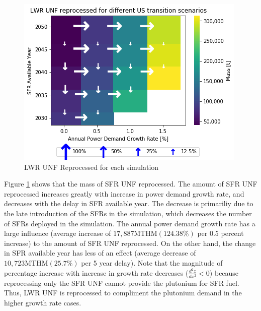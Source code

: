 \begin{figure}[htbp!]
    \begin{center}
        \includegraphics[scale=0.7]{./images/us/scat_both_LWR_UNF_reprocessed.png}
    \end{center}
        \caption{\gls{LWR} \gls{UNF} Reprocessed for each simulation}
    \label{fig:us_lwr_unf_rep}
\end{figure}


Figure \ref{fig:us_lwr_unf_rep} shows that the mass of \gls{SFR} \gls{UNF} reprocessed.
The amount of \gls{SFR} \gls{UNF} reprocessed increases greatly with increase
in power demand growth rate, and decreases with the delay in
\gls{SFR} available year. The decrease is primariliy due to
the late introduction of the \glspl{SFR} in the simulation, which decreases the number of \glspl{SFR} deployed in the simulation. The annual power demand
growth rate has a large influence (average increase of $17,887 \text{MTHM} (124.38 \%)$ 
per 0.5 percent increase) to the amount of \gls{SFR} \gls{UNF}
reprocessed. On the other hand, the change in  \gls{SFR} available year
has less of an effect (average decrease of $10,723 \text{MTHM} (25.7\%)$
per 5 year delay). Note that the magnitude of percentage increase
with increase in growth rate decreases ($\frac{d^2z}{dx^2} < 0$)
because reprocessing only the \gls{SFR} \gls{UNF} cannot provide
the plutonium for \gls{SFR} fuel. Thus, \gls{LWR} \gls{UNF} is
reprocessed to compliment the plutonium demand in the higher
growth rate cases.

